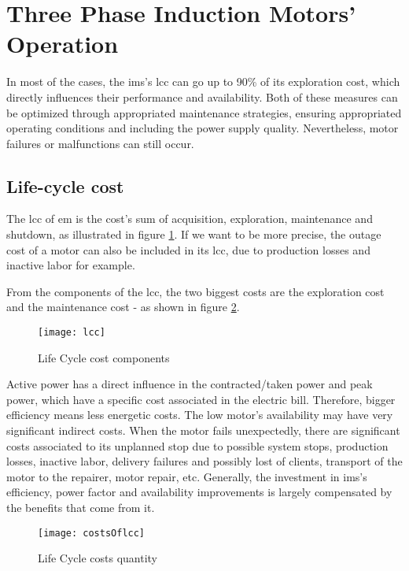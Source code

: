 \section{Three Phase Induction Motors' Operation} %
\label{sec:Three_phase_induction_motors_maintenance_and_lyfe_cycle}

In most of the cases, the \acrshort{ims}'s \acrfull{lcc} can go up to 90\% of its exploration cost, which directly influences their performance and availability. Both of these measures can be optimized through appropriated maintenance strategies, ensuring appropriated operating conditions and including the power supply quality. Nevertheless, motor failures or malfunctions can still occur.

\subsection{Life-cycle cost}
\label{subsec:life_cycle_cost}

The \acrshort{lcc} of \acrshort{em} is the cost's sum of acquisition, exploration, maintenance and shutdown, as illustrated in figure \ref{fig:lcc}. If we want to be more precise, the outage cost of a motor can also be included in its \acrshort{lcc}, due to production losses and inactive labor for example.


From the components of the \acrshort{lcc}, the two biggest costs are the exploration cost and the maintenance cost - as shown in figure \ref{fig:costsOflcc}.

\begin{figure}[htbp]
	\centering
	\texttt{[image: lcc]}
	\caption{Life Cycle cost components}
	\label{fig:lcc}
\end{figure}

Active power has a direct influence in the contracted/taken power and peak power, which have a specific cost associated in the electric bill. Therefore, bigger efficiency means less energetic costs.
The low motor's availability may have very significant indirect costs. When the motor fails unexpectedly, there are significant costs associated to its unplanned stop due to possible system stops, production losses, inactive labor, delivery failures and possibly lost of clients, transport of the motor to the repairer, motor repair, etc. 
Generally, the investment in \acrshort{ims}'s efficiency, power factor and availability improvements is largely compensated by the benefits that come from it.
 
\begin{figure}[htbp]
	\centering
	\texttt{[image: costsOflcc]}
	\caption{Life Cycle costs quantity}
	\label{fig:costsOflcc}
\end{figure}

